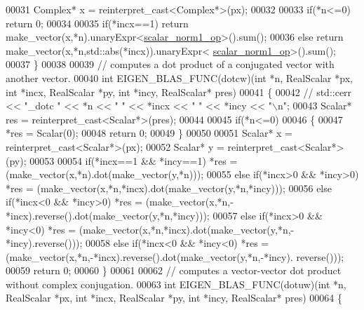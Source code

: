 \begin{DoxyCode}
00031   Complex* x = \textcolor{keyword}{reinterpret\_cast<}Complex*\textcolor{keyword}{>}(px);
00032 
00033   \textcolor{keywordflow}{if}(*n<=0) \textcolor{keywordflow}{return} 0;
00034 
00035   \textcolor{keywordflow}{if}(*incx==1)  \textcolor{keywordflow}{return} make\_vector(x,*n).unaryExpr<\hyperlink{structscalar__norm1__op}{scalar\_norm1\_op}>().sum();
00036   \textcolor{keywordflow}{else}          \textcolor{keywordflow}{return} make\_vector(x,*n,std::abs(*incx)).unaryExpr<
      \hyperlink{structscalar__norm1__op}{scalar\_norm1\_op}>().sum();
00037 \}
00038 
00039 \textcolor{comment}{// computes a dot product of a conjugated vector with another vector.}
00040 \textcolor{keywordtype}{int} EIGEN\_BLAS\_FUNC(dotcw)(\textcolor{keywordtype}{int} *n, RealScalar *px, \textcolor{keywordtype}{int} *incx, RealScalar *py, \textcolor{keywordtype}{int} *incy, RealScalar* pres)
00041 \{
00042 \textcolor{comment}{//   std::cerr << "\_dotc " << *n << " " << *incx << " " << *incy << "\(\backslash\)n";}
00043   Scalar* res = \textcolor{keyword}{reinterpret\_cast<}Scalar*\textcolor{keyword}{>}(pres);
00044 
00045   \textcolor{keywordflow}{if}(*n<=0)
00046   \{
00047     *res = Scalar(0);
00048     \textcolor{keywordflow}{return} 0;
00049   \}
00050 
00051   Scalar* x = \textcolor{keyword}{reinterpret\_cast<}Scalar*\textcolor{keyword}{>}(px);
00052   Scalar* y = \textcolor{keyword}{reinterpret\_cast<}Scalar*\textcolor{keyword}{>}(py);
00053 
00054   \textcolor{keywordflow}{if}(*incx==1 && *incy==1)    *res = (make\_vector(x,*n).dot(make\_vector(y,*n)));
00055   \textcolor{keywordflow}{else} \textcolor{keywordflow}{if}(*incx>0 && *incy>0) *res = (make\_vector(x,*n,*incx).dot(make\_vector(y,*n,*incy)));
00056   \textcolor{keywordflow}{else} \textcolor{keywordflow}{if}(*incx<0 && *incy>0) *res = (make\_vector(x,*n,-*incx).reverse().dot(make\_vector(y,*n,*incy)));
00057   \textcolor{keywordflow}{else} \textcolor{keywordflow}{if}(*incx>0 && *incy<0) *res = (make\_vector(x,*n,*incx).dot(make\_vector(y,*n,-*incy).reverse()));
00058   \textcolor{keywordflow}{else} \textcolor{keywordflow}{if}(*incx<0 && *incy<0) *res = (make\_vector(x,*n,-*incx).reverse().dot(make\_vector(y,*n,-*incy).
      reverse()));
00059   \textcolor{keywordflow}{return} 0;
00060 \}
00061 
00062 \textcolor{comment}{// computes a vector-vector dot product without complex conjugation.}
00063 \textcolor{keywordtype}{int} EIGEN\_BLAS\_FUNC(dotuw)(\textcolor{keywordtype}{int} *n, RealScalar *px, \textcolor{keywordtype}{int} *incx, RealScalar *py, \textcolor{keywordtype}{int} *incy, RealScalar* pres)
00064 \{

\end{DoxyCode}

